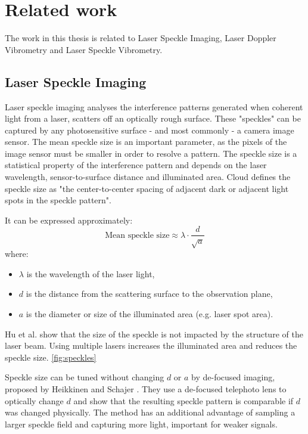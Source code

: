 \section{Related work}
\label{sec:related_work}

The work in this thesis is related to Laser Speckle Imaging, Laser Doppler Vibrometry and Laser Speckle Vibrometry.

\subsection{Laser Speckle Imaging}
Laser speckle imaging analyses the interference patterns generated when coherent light from a laser, scatters off an optically rough surface. 
These "speckles" can be captured by any photosensitive surface - and most commonly - a camera image sensor. 
The mean speckle size is an important parameter, as the pixels of the image sensor must be smaller in order to resolve a pattern. 
The speckle size is a statistical property of the interference pattern and depends on the laser wavelength, sensor-to-surface distance and illuminated area. 
Cloud \cite{specklesize} defines the speckle size as "the center-to-center spacing of adjacent dark or adjacent light spots in the speckle pattern". 

It can be expressed approximately:
\[
\text{Mean speckle size} \approx \lambda \cdot \frac{d}{\sqrt{a}}
\]
where:
\begin{itemize}
    \item \(\lambda\) is the wavelength of the laser light,
    \item \(d\) is the distance from the scattering surface to the observation plane,
    \item \(a\) is the diameter or size of the illuminated area (e.g. laser spot area).
\end{itemize}

Hu et al. \cite{specklesizeANDstructure} show that the size of the speckle is not impacted by the structure of the laser beam.
Using multiple lasers increases the illuminated area and reduces the speckle size. \ref{fig:speckles}

Speckle size can be tuned without changing $d$ or $a$ by de-focused imaging, proposed by Heikkinen and Schajer \cite{defocusedVSobjective}.
They use a de-focused telephoto lens to optically change $d$ and show that the resulting speckle pattern is comparable if $d$ was changed physically.
The method has an additional advantage of sampling a larger speckle field and capturing more light, important for weaker signals.

